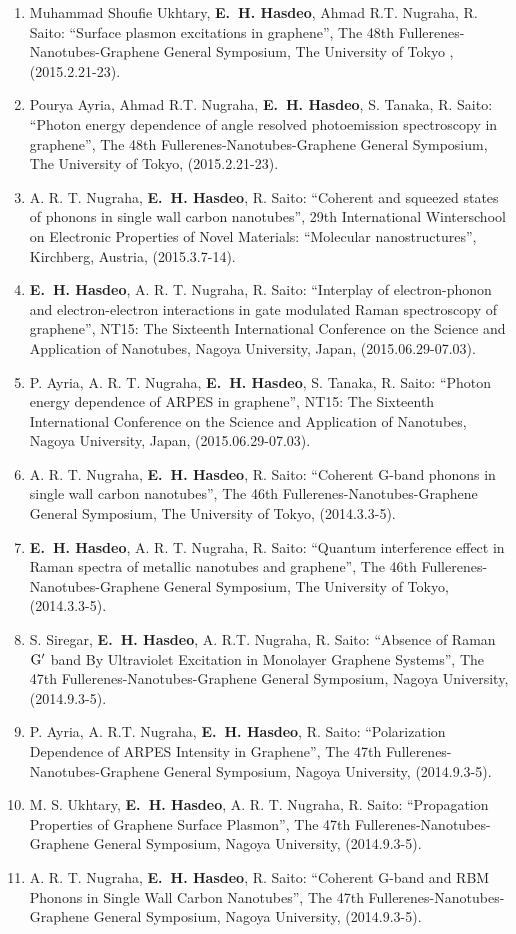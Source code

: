 \documentclass[a4paper,11pt]{article}
\newcommand{\jjm}[5]{\item {#1}: {``#2''}, {#3}, {#5}, (#4).}
\newcommand{\rs}{R. Saito}
\def\Gprime{{\rm G^{\prime}}}
\def\hes{{\bf E.~H. Hasdeo}}
\begin{document}
\begin{enumerate}
\jjm{Muhammad Shoufie Ukhtary, \hes, Ahmad R.T. Nugraha, \rs} %
{Surface plasmon excitations in graphene}
{The 48th Fullerenes-Nanotubes-Graphene General Symposium}
{2015.2.21-23}{The University of Tokyo
}
\jjm{Pourya Ayria, Ahmad R.T. Nugraha, \hes, S. Tanaka, \rs} %
{Photon energy dependence of angle resolved photoemission spectroscopy in graphene}
{The 48th Fullerenes-Nanotubes-Graphene General Symposium}
{2015.2.21-23}{The University of Tokyo}

\jjm{A. R. T. Nugraha, \hes, \rs}
{Coherent and squeezed states of phonons in single wall carbon nanotubes}
{29th International Winterschool on Electronic Properties of Novel Materials: ``Molecular nanostructures''}
{2015.3.7-14}{Kirchberg, Austria}


\jjm{\hes, A. R. T. Nugraha, \rs} {Interplay of
  electron-phonon and electron-electron interactions in gate modulated
  Raman spectroscopy of graphene} {NT15: The Sixteenth International
  Conference on the Science and Application of Nanotubes}
{2015.06.29-07.03}{Nagoya University, Japan}
\jjm{P. Ayria, A. R. T. Nugraha, \hes, S. Tanaka, \rs}
{Photon energy dependence of ARPES in graphene}
{NT15: The Sixteenth International Conference on the Science and Application of Nanotubes}
{2015.06.29-07.03}{Nagoya University, Japan}


\jjm{A. R. T.  Nugraha, \hes, \rs} 
{Coherent G-band phonons in single wall carbon nanotubes}
{The 46th Fullerenes-Nanotubes-Graphene General Symposium}
{2014.3.3-5}{The University of Tokyo}


\jjm{\hes, A. R. T. Nugraha, \rs} 
{Quantum interference effect in Raman spectra of metallic nanotubes and
graphene}
{The 46th Fullerenes-Nanotubes-Graphene General Symposium}
{2014.3.3-5}{The University of Tokyo}

\jjm{S. Siregar, \hes, A. R.T. Nugraha, \rs} %
{Absence of Raman $\Gprime$ band By Ultraviolet Excitation in Monolayer Graphene Systems}{The 47th Fullerenes-Nanotubes-Graphene General Symposium}
{2014.9.3-5}{Nagoya University}
\jjm{P. Ayria, A. R.T. Nugraha, \hes, \rs} 
{Polarization Dependence of ARPES Intensity in Graphene}
{The 47th Fullerenes-Nanotubes-Graphene General Symposium}
{2014.9.3-5}{Nagoya University}
\jjm{M. S. Ukhtary, \hes, A. R. T. Nugraha, \rs} 
{Propagation Properties of Graphene Surface Plasmon}
{The 47th Fullerenes-Nanotubes-Graphene General Symposium}
{2014.9.3-5}{Nagoya University}
\jjm{A. R. T. Nugraha, \hes, \rs}
{Coherent G-band and RBM Phonons in Single Wall Carbon Nanotubes}
{The 47th Fullerenes-Nanotubes-Graphene General Symposium}
{2014.9.3-5}{Nagoya University}


\end{enumerate}
\end{document}
